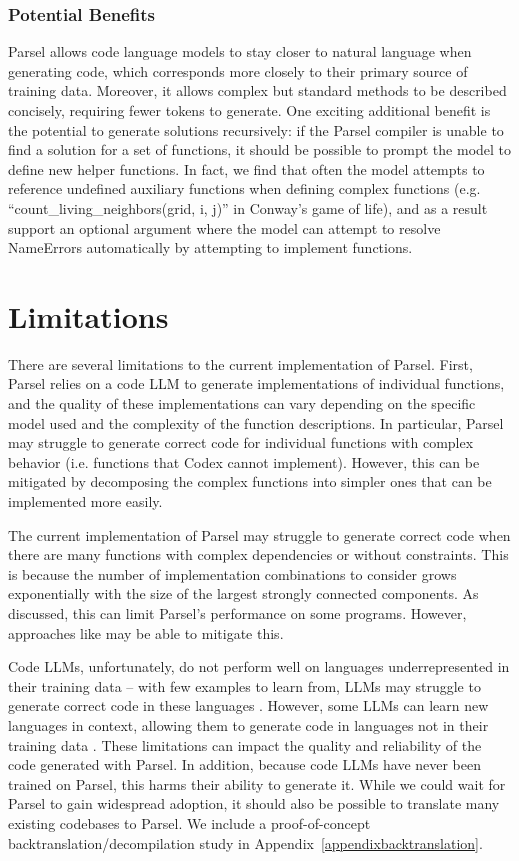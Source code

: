 \subsubsection{Potential Benefits}
Parsel allows code language models to stay closer to natural language when generating code, which corresponds more closely to their primary source of training data. Moreover, it allows complex but standard methods to be described concisely, requiring fewer tokens to generate. One exciting additional benefit is the potential to generate solutions recursively: if the Parsel compiler is unable to find a solution for a set of functions, it should be possible to prompt the model to define new helper functions. In fact, we find that often the model attempts to reference undefined auxiliary functions when defining complex functions (e.g. ``count\_living\_neighbors(grid, i, j)'' in Conway's game of life), and as a result support an optional argument where the model can attempt to resolve NameErrors automatically by attempting to implement functions.


\section{Limitations}
\label{limitations}
There are several limitations to the current implementation of Parsel. First, Parsel relies on a code LLM to generate implementations of individual functions, and the quality of these implementations can vary depending on the specific model used and the complexity of the function descriptions. In particular, Parsel may struggle to generate correct code for individual functions with complex behavior (i.e. functions that Codex cannot implement). However, this can be mitigated by decomposing the complex functions into simpler ones that can be implemented more easily.

The current implementation of Parsel may struggle to generate correct code when there are many functions with complex dependencies or without constraints. This is because the number of implementation combinations to consider grows exponentially with the size of the largest strongly connected components. As discussed, this can limit Parsel's performance on some programs. However, approaches like \citet{chen2022codet} may be able to mitigate this.

Code LLMs, unfortunately, do not perform well on languages underrepresented in their training data -- with few examples to learn from, LLMs may struggle to generate correct code in these languages \citep{athiwaratkun2022multi}. However, some LLMs can learn new languages in context, allowing them to generate code in languages not in their training data \citep{athiwaratkun2022multi}. These limitations can impact the quality and reliability of the code generated with Parsel. In addition, because code LLMs have never been trained on Parsel, this harms their ability to generate it. While we could wait for Parsel to gain widespread adoption, it should also be possible to translate many existing codebases to Parsel. We include a proof-of-concept backtranslation/decompilation study in Appendix~\ref{appendixbacktranslation}.

